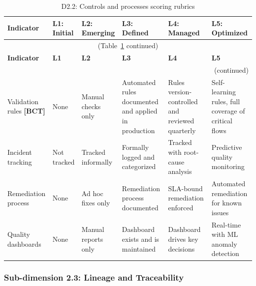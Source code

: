 \begin{center}
{\small
\begin{longtable}{|p{2.4cm}|p{2.0cm}|p{2.0cm}|p{2.2cm}|p{2.2cm}|p{2.2cm}|}
\caption{D2.2: Controls and processes scoring rubrics} \label{tab:d2-2} \\
\hline
\textbf{Indicator} & \textbf{L1: Initial} & \textbf{L2: Emerging} & \textbf{L3: Defined} & \textbf{L4: Managed} & \textbf{L5: Optimized} \\
\hline
\endfirsthead
\multicolumn{6}{c}{\small (Table~\ref{tab:d2-2} continued)} \\
\hline
\textbf{Indicator} & \textbf{L1} & \textbf{L2} & \textbf{L3} & \textbf{L4} & \textbf{L5} \\
\hline
\endhead
\hline
\multicolumn{6}{r}{\small (continued)} \\
\endfoot
\hline
\endlastfoot
Validation rules \textbf{[BCT]} &
  None &
  Manual checks only &
  Automated rules documented and applied in production &
  Rules version-controlled and reviewed quarterly &
  Self-learning rules, full coverage of critical flows \\
\hline
Incident tracking &
  Not tracked &
  Tracked informally &
  Formally logged and categorized &
  Tracked with root-cause analysis &
  Predictive quality monitoring \\
\hline
Remediation process &
  None &
  Ad hoc fixes only &
  Remediation process documented &
  SLA-bound remediation enforced &
  Automated remediation for known issues \\
\hline
Quality dashboards &
  None &
  Manual reports only &
  Dashboard exists and is maintained &
  Dashboard drives key decisions &
  Real-time with ML anomaly detection \\
\hline
\end{longtable}
}
\end{center}

\subsubsection*{Sub-dimension 2.3: Lineage and Traceability}

